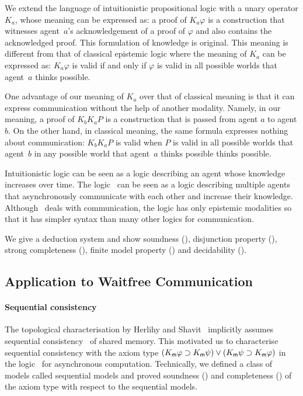     We extend the language of intuitionistic propositional logic with a unary operator $K_a$,
    whose meaning can be expressed as:
    a proof of $K_a\varphi$ is a construction that witnesses agent~$a$'s
    acknowledgement of a proof of $\varphi$ and also contains the acknowledged
    proof.  This formulation of knowledge is original.
    This meaning is different from that of classical epistemic logic where
    the meaning of $K_a$ can be expressed as:
    $K_a\varphi$ is valid if and only if $\varphi$ is valid in all possible worlds
    that agent~$a$ thinks possible.

    One advantage of our meaning of $K_a$ over that of classical meaning is that
    it can express communication without the help of another modality.
    Namely, in our meaning,
    a proof of $K_bK_a P$ is a construction that is passed from agent $a$ to agent
    $b$.
    On the other hand, in classical meaning, the same formula expresses nothing about
    communication:
    $K_b K_a P$ is valid when $P$ is valid in all possible worlds that agent~$b$ in any
    possible world that agent~$a$ thinks possible thinks possible.

    Intuitionistic logic can be seen as a logic describing an agent whose knowledge increases over
    time.
    The logic \iec\,  can be seen as a logic describing multiple agents
    that asynchronously communicate with each other and increase their knowledge.
    Although \iec\, deals with communication, the logic has only epistemic modalities so that it
    has simpler syntax than many other logics for communication.

    We give a deduction system and show
    soundness (),
    disjunction property (),
    strong completeness
    (), finite model property
    () and decidability ().

  \subsection{Application to Waitfree Communication}

    \paragraph{Sequential consistency}
    The topological characterisation by Herlihy and Shavit~\cite{herlihy1999topological}
    implicitly assumes sequential consistency~\cite{lamport1979make} of shared memory.
    This motivated us to characterise sequential consistency with the axiom type
    $(K_{\sf m} \varphi\supset K_{\sf m} \psi)\vee (K_{\sf m}
       \psi\supset K_{\sf m} \varphi)$
       in the logic \iec\, for asynchronous computation.
       Technically, we defined a class of models called sequential models
       and proved soundness
       () and completeness
       () of the axiom type with respect to the sequential models.

